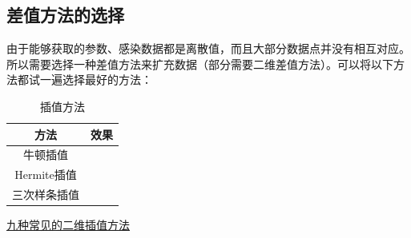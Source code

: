 \documentclass{article}
\numberwithin{figure}{section}
\numberwithin{equation}{section}
\numberwithin{table}{section}
\begin{document}
\subsection{差值方法的选择}
由于能够获取的参数、感染数据都是离散值，而且大部分数据点并没有相互对应。所以需要选择一种差值方法来扩充数据（部分需要二维差值方法）。可以将以下方法都试一遍选择最好的方法：

\begin{table}[h!]
  \begin{center}
    \caption{插值方法}
    \begin{tabular}{cc} %
\toprule
方法 & 效果 \\
\midrule
牛顿插值 & \\
Hermite插值 & \\
三次样条插值 & \\
\bottomrule
    \end{tabular}
  \end{center}
\end{table}

\href{https://blog.csdn.net/yanfeng1022/article/details/114528323}{九种常见的二维插值方法}
\printbibliography
\end{document}
